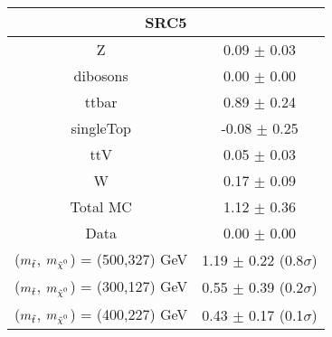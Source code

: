 \begin{tabular}{c|c}
\hline\hline
\multicolumn{2}{c}{\bf SRC5 } \\ \hline 
Z & 0.09 $\pm$ 0.03 \\
dibosons & 0.00 $\pm$ 0.00 \\
ttbar & 0.89 $\pm$ 0.24 \\
singleTop & -0.08 $\pm$ 0.25 \\
ttV & 0.05 $\pm$ 0.03 \\
W & 0.17 $\pm$ 0.09 \\
\hline
Total MC & 1.12 $\pm$ 0.36 \\
Data & 0.00 $\pm$ 0.00 \\
\hline
 ($m_{\tilde{t}}$, $\mLSP$) = (500,327) GeV & 1.19 $\pm$ 0.22 (0.8$\sigma$) \\
\hline
 ($m_{\tilde{t}}$, $\mLSP$) = (300,127) GeV & 0.55 $\pm$ 0.39 (0.2$\sigma$) \\
\hline
 ($m_{\tilde{t}}$, $\mLSP$) = (400,227) GeV & 0.43 $\pm$ 0.17 (0.1$\sigma$) \\
\hline\hline
\end{tabular}
